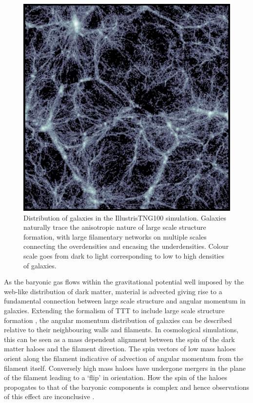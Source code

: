 \begin{figure}
	\includegraphics[width=\linewidth]{thesis/latex/introduction/slice_image_bone.pdf}
    \caption{Distribution of galaxies in the IllustrisTNG100 simulation. Galaxies naturally trace the anisotropic nature of large scale structure formation, with large filamentary networks on multiple scales connecting the overdensities and encasing the underdensities. Colour scale goes from dark to light corresponding to low to high densities of galaxies.}
    \label{fig:cosmo_web_tng}
\end{figure}

As the baryonic gas flows within the gravitational potential well imposed by the web-like distribution of dark matter, material is advected giving rise to a fundamental connection between large scale structure and angular momentum in galaxies. Extending the formalism of TTT to include large scale structure formation \citep[e.g.][]{pichon2011, codis2015, laigle2015}, the angular momentum distribution of galaxies can be described relative to their neighbouring walls and filaments. In cosmological simulations, this can be seen as a mass dependent alignment between the spin of the dark matter haloes and the filament direction. The spin vectors of low mass haloes orient along the filament indicative of advection of angular momentum from the filament itself. Conversely high mass haloes have undergone mergers in the plane of the filament leading to a `flip' in orientation. How the spin of the haloes propogates to that of the baryonic components is complex and hence observations of this effect are inconclusive \citep[e.g.][]{tempel2013, krolewski2019, welker2020}. 

